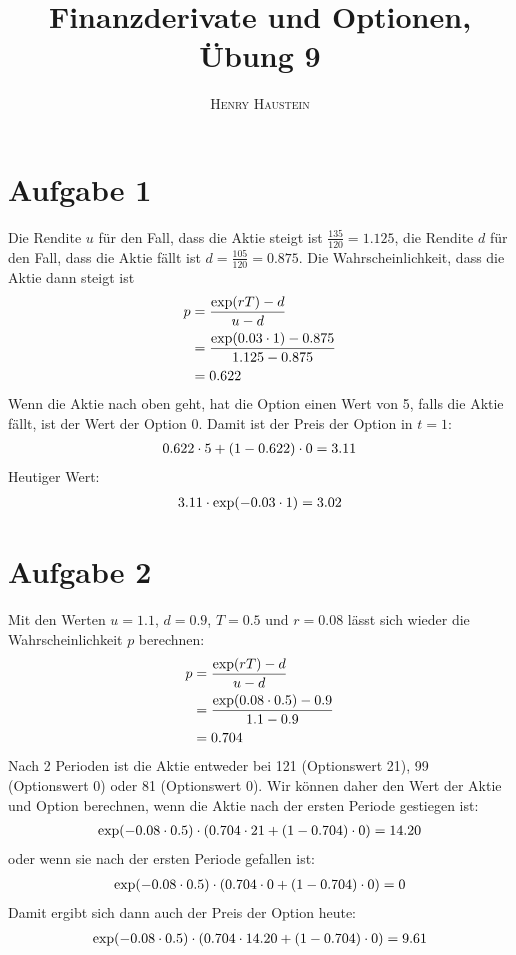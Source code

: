 \documentclass{article}
\title{\textbf{Finanzderivate und Optionen, Übung 9}}
\author{\textsc{Henry Haustein}}
\date{}
\begin{document}
	\maketitle
	
	\section*{Aufgabe 1}
	Die Rendite $u$ für den Fall, dass die Aktie steigt ist $\frac{135}{120} = 1.125$, die Rendite $d$ für den Fall, dass die Aktie fällt ist $d = \frac{105}{120} = 0.875$. Die Wahrscheinlichkeit, dass die Aktie dann steigt ist
	\begin{align}
		p &= \frac{\exp(rT) - d}{u-d} \notag \\
		&= \frac{\exp(0.03\cdot 1) - 0.875}{1.125 - 0.875} \notag \\
		&= 0.622 \notag
	\end{align}
	Wenn die Aktie nach oben geht, hat die Option einen Wert von 5, falls die Aktie fällt, ist der Wert der Option 0. Damit ist der Preis der Option in $t=1$:
	\begin{align}
		0.622\cdot 5 + (1-0.622)\cdot 0 = 3.11 \notag
	\end{align}
	Heutiger Wert:
	\begin{align}
		3.11\cdot \exp(-0.03\cdot 1) = 3.02 \notag
	\end{align}

	\section*{Aufgabe 2}
	Mit den Werten $u=1.1$, $d=0.9$, $T=0.5$ und $r=0.08$ lässt sich wieder die Wahrscheinlichkeit $p$ berechnen:
	\begin{align}
		p &= \frac{\exp(rT) - d}{u-d} \notag \\
		&= \frac{\exp(0.08\cdot 0.5) - 0.9}{1.1 - 0.9} \notag \\
		&= 0.704 \notag
	\end{align}
	Nach 2 Perioden ist die Aktie entweder bei 121 (Optionswert 21), 99 (Optionswert 0) oder 81 (Optionswert 0). Wir können daher den Wert der Aktie und Option berechnen, wenn die Aktie nach der ersten Periode gestiegen ist:
	\begin{align}
		\exp(-0.08\cdot 0.5)\cdot (0.704\cdot 21 + (1-0.704)\cdot 0) = 14.20 \notag
	\end{align}
	oder wenn sie nach der ersten Periode gefallen ist:
	\begin{align}
		\exp(-0.08\cdot 0.5)\cdot (0.704\cdot 0 + (1-0.704)\cdot 0) = 0 \notag
	\end{align}
	Damit ergibt sich dann auch der Preis der Option heute:
	\begin{align}
		\exp(-0.08\cdot 0.5)\cdot (0.704\cdot 14.20 + (1-0.704)\cdot 0) = 9.61 \notag
	\end{align}
	
\end{document}
